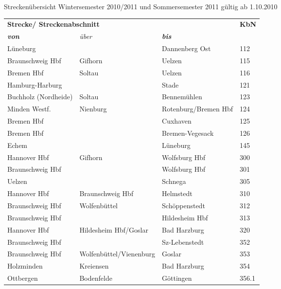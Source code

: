 Streckenübersicht Wintersemester 2010/2011 und Sommersemester 2011 gültig ab 1.10.2010

\enlargethispage{0.5cm} 
 
\begin{tabular}{|l|l|l|p{2cm}|}
\hline
\multicolumn{3}{|l|}{\textbf{Strecke/ Streckenabschnitt}}& \textbf{KbN}\\
\textbf{\textit{von}} & \textit{über} & \textbf{\textit{bis}} & \\ \cline{ 1- 4}
Lüneburg &  & Dannenberg Ost & 112 \\ \hline
Braunschweig Hbf & Gifhorn & Uelzen & 115 \\ \hline
Bremen Hbf & Soltau & Uelzen & 116 \\ \hline
Hamburg-Harburg &  & Stade & 121 \\ \hline
Buchholz (Nordheide) & Soltau & Bennemühlen & 123 \\ \hline
Minden Westf. & Nienburg & Rotenburg/Bremen Hbf & 124 \\ \hline
Bremen Hbf &  & Cuxhaven & 125 \footnotemark[1] \\ \hline
Bremen Hbf &  & Bremen-Vegesack & 126 \footnotemark[1] \\ \hline
Echem &  & Lüneburg & 145 \\ \hline
Hannover Hbf & Gifhorn & Wolfsburg Hbf & 300 \\ \hline
Braunschweig Hbf &  & Wolfsburg Hbf & 301 \\ \hline
Uelzen &  & Schnega & 305 \\ \hline
Hannover Hbf & Braunschweig Hbf & Helmstedt & 310 \\ \hline
Braunschweig Hbf & Wolfenbüttel & Schöppenstedt & 312 \footnotemark[2] \\ \hline
Braunschweig Hbf &  & Hildesheim Hbf & 313 \\ \hline
Hannover Hbf & Hildesheim Hbf/Goslar & Bad Harzburg & 320 \\ \hline
Braunschweig Hbf &  & Sz-Lebenstedt & 352 \\ \hline
Braunschweig Hbf & Wolfenbüttel/Vienenburg & Goslar & 353 \\ \hline
Holzminden & Kreiensen & Bad Harzburg & 354 \\ \hline
Ottbergen & Bodenfelde & Göttingen & 356.1 \\ \hline

\end{tabular}
